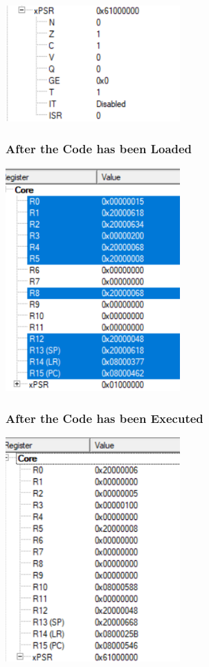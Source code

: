 \documentclass{article}
\begin{document}
\begin{center}
    \includegraphics[width=0.5\textwidth]{task_iv_C_PSR.png}
\end{center}

\subsubsection{After the Code has been Loaded}

\begin{center}
    \includegraphics[width=0.5\textwidth]{task_iv_C_before.png}
\end{center}

\subsubsection{After the Code has been Executed}

\begin{center}
    \includegraphics[width=0.5\textwidth]{task_iv_C_after.png}
\end{center}
\end{document}
